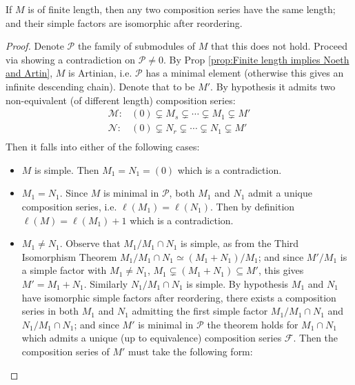 \begin{theorem}\label{thm:Jordan-Holder}
   If $M$ is of finite length, then any two composition series have the same length; and their simple factors are isomorphic after reordering. 
\end{theorem}

\begin{proof}
    Denote $\mathcal{P}$ the family of submodules of $M$ that this does not hold. Proceed via showing a contradiction on $\mathcal{P} \neq 0$. By Prop \ref{prop:Finite length implies Noeth and Artin}, $M$ is Artinian, i.e. $\mathcal{P}$ has a minimal element (otherwise this gives an infinite descending chain). Denote that to be $M'$. By hypothesis it admits two non-equivalent (of different length) composition series:
    \[
    \begin{array}{cc}
        \mathcal{M}: & (0) \subsetneq M_s \subsetneq \cdots \subsetneq M_1 \subsetneq M' \\
        \mathcal{N}: & (0) \subsetneq N_r \subsetneq \cdots \subsetneq N_1 \subsetneq M' \\
    \end{array}
    \]
    Then it falls into either of the following cases:
    \begin{itemize}
        \item $M$ is simple. Then $M_1 = N_1 = (0)$ which is a contradiction.
        \item $M_1 = N_1$. Since $M$ is minimal in $\mathcal{P}$, both $M_1$ and $N_1$ admit a unique composition series, i.e. $\ell(M_1) = \ell(N_1)$. Then by definition $\ell(M) = \ell(M_1) + 1$ which is a contradiction.
        \item $M_1\neq N_1$. Observe that $M_1/M_1\cap N_1$ is simple, as from the Third Isomorphism Theorem $M_1/M_1\cap N_1 \simeq (M_1 + N_1)/M_1$; and since $M'/M_1$ is a simple factor with $M_1 \neq N_1$, $M_1 \subsetneq (M_1 + N_1) \subseteq M'$, this gives $M' = M_1 + N_1$. Similarly $N_1/M_1\cap N_1$ is simple. By hypothesis $M_1$ and $N_1$ have isomorphic simple factors after reordering, there exists a composition series in both $M_1$ and $N_1$ admitting the first simple factor $M_1/M_1\cap N_1$ and $N_1/M_1\cap N_1$; and since $M'$ is minimal in $\mathcal{P}$ the theorem holds for $M_1\cap N_1$ which admits a unique (up to equivalence) composition series $\mathcal{F}$. Then the composition series of $M'$ must take the following form:
        
        \begin{minipage}{\linewidth}
            \centering
        \end{minipage}


\end{itemize}
\end{proof}
